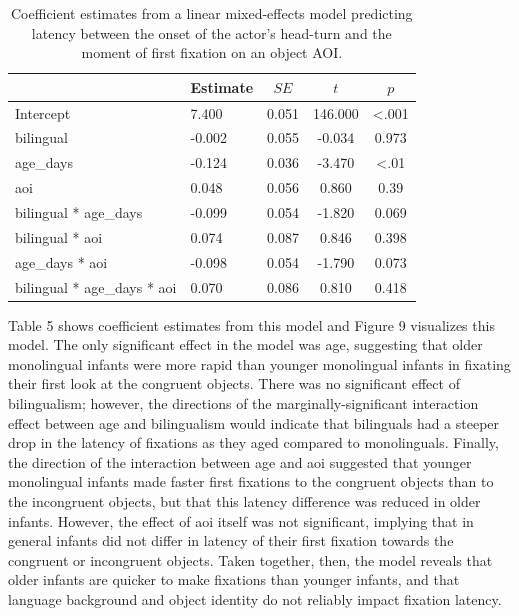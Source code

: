 \documentclass[english,,man,floatsintext]{apa6}
\begin{document}
\begin{table}[tbp]
\begin{center}
\begin{threeparttable}
\caption{\label{tab:coef_table_latency}Coefficient estimates from a linear mixed-effects model predicting latency between the onset of the actor's head-turn and the moment of first fixation on an object AOI.}
\begin{tabular}{llccc}
\toprule
 & Estimate & $SE$ & $t$ & $p$\\
\midrule
Intercept & 7.400 & 0.051 & 146.000 & <.001\\
bilingual & -0.002 & 0.055 & -0.034 & 0.973\\
age\_days & -0.124 & 0.036 & -3.470 & <.01\\
aoi & 0.048 & 0.056 & 0.860 & 0.39\\
bilingual * age\_days & -0.099 & 0.054 & -1.820 & 0.069\\
bilingual * aoi & 0.074 & 0.087 & 0.846 & 0.398\\
age\_days * aoi & -0.098 & 0.054 & -1.790 & 0.073\\
bilingual * age\_days * aoi & 0.070 & 0.086 & 0.810 & 0.418\\
\bottomrule
\end{tabular}
\end{threeparttable}
\end{center}
\end{table}

\noindent Table 5 shows coefficient estimates from this model and Figure 9 visualizes this model. The only significant effect in the model was age, suggesting that older monolingual infants were more rapid than younger monolingual infants in fixating their first look at the congruent objects. There was no significant effect of bilingualism; however, the directions of the marginally-significant interaction effect between age and bilingualism would indicate that bilinguals had a steeper drop in the latency of fixations as they aged compared to monolinguals. Finally, the direction of the interaction between age and aoi suggested that younger monolingual infants made faster first fixations to the congruent objects than to the incongruent objects, but that this latency difference was reduced in older infants. However, the effect of aoi itself was not significant, implying that in general infants did not differ in latency of their first fixation towards the congruent or incongruent objects. Taken together, then, the model reveals that older infants are quicker to make fixations than younger infants, and that language background and object identity do not reliably impact fixation latency.
\end{document}
